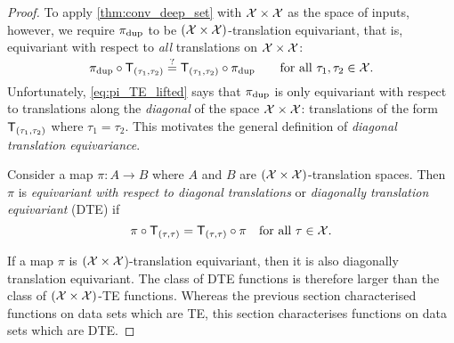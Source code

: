 \documentclass[12pt, twoside]{report}
\begin{document}
\begin{proof}
To apply \cref{thm:conv_deep_set} with $\mathcal{X} \times \mathcal{X}$ as the space of inputs, however, we require $\pi\ss{dup}$ to be $(\mathcal{X} \times \mathcal{X})$-translation equivariant, that is, equivariant with respect to \emph{all} translations on $\mathcal{X} \times \mathcal{X}$:%
\begin{equation} \label{eq:translation_equivariance_lifted}
    \smash{
        \pi\ss{dup} \comp \T_{(\tau_1, \tau_2)} \overset{\text{?}}{=} \T_{(\tau_1, \tau_2)} \comp \pi\ss{dup}
    }
    \qquad \text{for all $\tau_1, \tau_2 \in \X$}.
\end{equation}
Unfortunately, \eqref{eq:pi_TE_lifted} says that $\pi\ss{dup}$ is only equivariant with respect to translations along the \emph{diagonal} of the space $\mathcal{X} \times \mathcal{X}$: translations of the form $\T_{(\tau_1, \tau_2)}$ where $\tau_1 = \tau_2$.
This motivates the general definition of \emph{diagonal translation equivariance}.

\begin{definition}
    \label{def:diagonal_translation_equivariance}
    Consider a map $\pi \colon A \to B$ where $A$ and $B$ are $(\mathcal{X} \times \mathcal{X})$-translation spaces.
    Then $\pi$ is \emph{equivariant with respect to diagonal translations} or \emph{diagonally translation equivariant} (DTE) if 
    \begin{equation}
        \pi \comp \T_{(\tau, \tau)} = \T_{(\tau, \tau)} \comp \pi
        \quad
        \text{for all $\tau \in \X$}.
    \end{equation}
\end{definition}

If a map $\pi$ is $(\mathcal{X} \times \mathcal{X}$)-translation equivariant, then it is also diagonally translation equivariant.
The class of DTE functions is therefore larger than the class of $(\mathcal{X} \times \mathcal{X})$-TE functions.
Whereas the previous section characterised functions on data sets which are TE, this section characterises functions on data sets which are DTE.


\end{proof}
\end{document}
